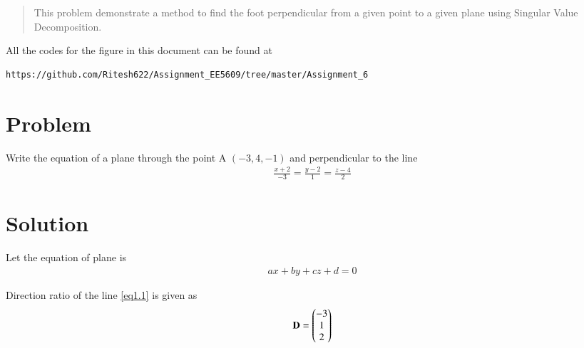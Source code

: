 \documentclass[journal,12pt,twocolumn]{IEEEtran}
\begin{document}
	
	\maketitle
	\newpage
	\bigskip
	\renewcommand{\thefigure}{\theenumi}
	\renewcommand{\thetable}{\theenumi}
	\date{Today}
	
\begin{abstract}
This problem demonstrate a method to  find the foot perpendicular  from a given point to a given plane using Singular Value Decomposition.
\end{abstract}
All the codes for the figure in this document can be found at
\begin{lstlisting}
https://github.com/Ritesh622/Assignment_EE5609/tree/master/Assignment_6
\end{lstlisting}
\section{\textbf{Problem}}
Write the equation of a plane through the point A $\left(-3, 4, -1 \right)$ and perpendicular to the line 
\begin{align}
\frac{x+2}{-3} = \frac{y - 2}{1} = \frac{z-4}{2} \label{eq1.1}
\end{align}
 \section{\textbf{Solution}} 
 Let the equation of plane is 
 \begin{align}
 ax +by +cz +d = 0 \label{eq2.1}
 \end{align}
 
  Direction ratio of the line \eqref{eq1.1} is given as 
  \begin{align}
  \mathbf{D} = \begin{pmatrix}-3 \\ 1 \\ 2\end{pmatrix}
  \end{align}
  
\end{document}
